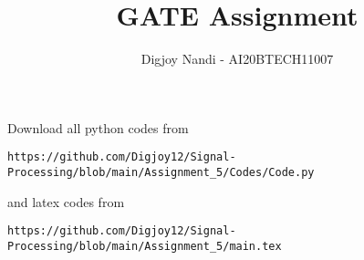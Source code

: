 \documentclass[journal,12pt,twocolumn]{IEEEtran}
\DeclareMathOperator*{\Res}{Res}
\begin{document}
\newcommand{\BEQA}{\begin{eqnarray}}
\newcommand{\EEQA}{\end{eqnarray}}
\newcommand{\define}{\stackrel{\triangle}{=}}

\raggedbottom
\setlength{\parindent}{0pt}
\providecommand{\mbf}{\mathbf}
\providecommand{\pr}[1]{\ensuremath{\Pr\left(#1\right)}}
\providecommand{\qfunc}[1]{\ensuremath{Q\left(#1\right)}}
\providecommand{\sbrak}[1]{\ensuremath{{}\left[#1\right]}}
\providecommand{\lsbrak}[1]{\ensuremath{{}\left[#1\right.}}
\providecommand{\rsbrak}[1]{\ensuremath{{}\left.#1\right]}}
\providecommand{\brak}[1]{\ensuremath{\left(#1\right)}}
\providecommand{\lbrak}[1]{\ensuremath{\left(#1\right.}}
\providecommand{\rbrak}[1]{\ensuremath{\left.#1\right)}}
\providecommand{\cbrak}[1]{\ensuremath{\left\{#1\right\}}}
\providecommand{\lcbrak}[1]{\ensuremath{\left\{#1\right.}}
\providecommand{\rcbrak}[1]{\ensuremath{\left.#1\right\}}}
\theoremstyle{remark}
\newtheorem{rem}{Remark}
\newcommand{\sgn}{\mathop{\mathrm{sgn}}}
\providecommand{\abs}[1]{\vert#1\vert}
\providecommand{\res}[1]{\Res\displaylimits_{#1}} 
\providecommand{\norm}[1]{\lVert#1\rVert}
\providecommand{\mtx}[1]{\mathbf{#1}}
\providecommand{\mean}[1]{E[ #1 ]}
\providecommand{\fourier}{\overset{\mathcal{F}}{ \rightleftharpoons}}
\providecommand{\system}{\overset{\mathcal{H}}{ \longleftrightarrow}}
\newcommand{\solution}{\noindent \textbf{Solution: }}
\newcommand{\cosec}{\,\text{cosec}\,}
\providecommand{\dec}[2]{\ensuremath{\overset{#1}{\underset{#2}{\gtrless}}}}
\newcommand{\myvec}[1]{\ensuremath{\begin{pmatrix}#1\end{pmatrix}}}
\newcommand{\mydet}[1]{\ensuremath{\begin{vmatrix}#1\end{vmatrix}}}
\makeatletter
{}
\makeatother
\let\StandardTheFigure\thefigure
\let\vec\mathbf
\renewcommand{\thefigure}{\theproblem}
\def\putbox#1#2#3{\makebox[0in][l]{\makebox[#1][l]{}\raisebox{\baselineskip}[0in][0in]{\raisebox{#2}[0in][0in]{#3}}}}
     \def\rightbox#1{\makebox[0in][r]{#1}}
     \def\centbox#1{\makebox[0in]{#1}}
     \def\topbox#1{\raisebox{-\baselineskip}[0in][0in]{#1}}
     \def\midbox#1{\raisebox{-0.5\baselineskip}[0in][0in]{#1}}
\vspace{3cm}
\title{GATE Assignment}
\author{Digjoy Nandi - AI20BTECH11007}
\maketitle
\newpage
\bigskip
\renewcommand{\thefigure}{\theenumi}
\renewcommand{\thetable}{\theenumi}
Download all python codes from 
\begin{lstlisting}
https://github.com/Digjoy12/Signal-Processing/blob/main/Assignment_5/Codes/Code.py
\end{lstlisting}
%
and latex codes from 
%
\begin{lstlisting}
https://github.com/Digjoy12/Signal-Processing/blob/main/Assignment_5/main.tex
\end{lstlisting}
\end{document}
